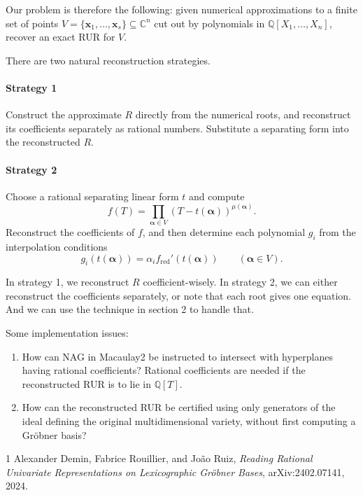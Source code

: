 \documentclass{weeklyprogress}
\begin{document}
Our problem is therefore the following: given numerical approximations to a finite set of points $V=\{\bm{x}_1,\ldots,\bm{x}_s\}\subseteq\mathbb{C}^n$ cut out by polynomials in $\mathbb{Q}[X_1,\ldots,X_n]$, recover an exact RUR for $V$.

There are two natural reconstruction strategies.

\paragraph{Strategy 1} Construct the approximate $R$ directly from the numerical roots, and reconstruct its coefficients separately as rational numbers. Substitute a separating form into the reconstructed $R$.

\paragraph{Strategy 2} Choose a rational separating linear form $t$ and compute
\[ f(T)=\prod_{\bm{\alpha}\in V}(T-t(\bm{\alpha}))^{\mu(\bm{\alpha})}. \]
Reconstruct the coefficients of $f$, and then determine each polynomial $g_i$ from the interpolation conditions
\[ g_i(t(\bm{\alpha}))=\alpha_i f_{\mathrm{red}}'(t(\bm{\alpha}))\qquad(\bm{\alpha}\in V). \]

In strategy 1, we reconstruct $R$ coefficient-wisely. In strategy 2, we can either reconstruct the coefficients separately, or note that each root gives one equation. And we can use the technique in section 2 to handle that.

Some implementation issues:

\begin{enumerate}
  \item How can NAG in Macaulay2 be instructed to intersect with hyperplanes having rational coefficients? Rational coefficients are needed if the reconstructed RUR is to lie in $\mathbb{Q}[T]$.
  \item How can the reconstructed RUR be certified using only generators of the ideal defining the original multidimensional variety, without first computing a Gr\"obner basis?
\end{enumerate}

\begin{thebibliography}{1}
   Alexander Demin, Fabrice Rouillier, and Jo\~ao Ruiz, \emph{Reading Rational Univariate Representations on Lexicographic Gr\"obner Bases}, arXiv:2402.07141, 2024.
\end{thebibliography}
\end{document}
